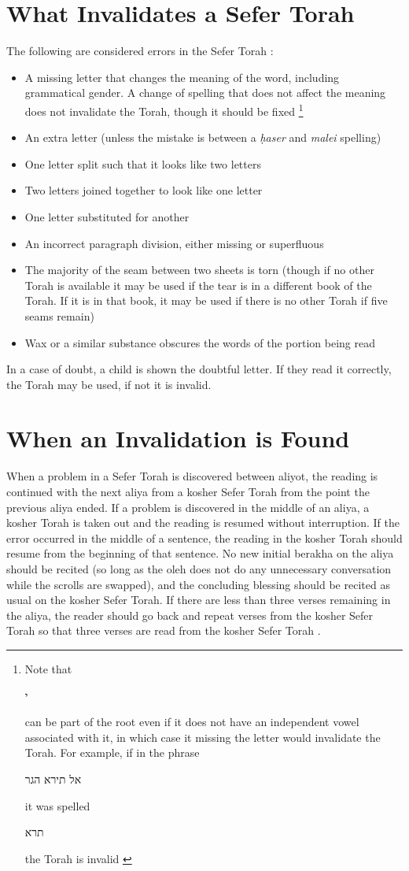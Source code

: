 \documentclass[11pt, openany]{article}
\newcommand{\hebword}[1]{‎\begin{hebrew}\beginR #1 \endR\end{hebrew}}
\newcommand{\heth}{\d{h}}
\begin{document}
		
\section*{What Invalidates a Sefer Torah}

The following are considered errors in the Sefer Torah \parencite*[24:1]{Kitzur}:
\begin{itemize}
	\item A missing letter that changes the meaning of the word, including grammatical gender. A change of spelling that does not affect the meaning does not invalidate the Torah, though it should be fixed \footnote{Note that\hebword{ י } can be part of the root even if it does not have an independent vowel associated with it, in which case it missing the letter would invalidate the Torah.  For example, if in the phrase \hebword{אל תירא הגר} it was spelled \hebword{תרא} the Torah is invalid \parencite*[24:1]{Kitzur}}
	\item An extra letter (unless the mistake is between a \textit{\heth aser} and \textit{malei} spelling)
	\item One letter split such that it looks like two letters
	\item Two letters joined together to look like one letter
	\item One letter substituted for another
	\item An incorrect paragraph division, either missing or superfluous
	\item The majority of the seam between two sheets is torn (though if no other Torah is available it may be used if the tear is in a different book of the Torah.  If it is in that book, it may be used if there is no other Torah if five seams remain)
	\item Wax or a similar substance obscures the words of the portion being read
\end{itemize}

In a case of doubt, a child is shown the doubtful letter.  If they read it correctly, the Torah may be used, if not it is invalid.

\section*{When an Invalidation is Found}

When a problem in a Sefer Torah is discovered between aliyot, the reading is continued with the next aliya from a kosher Sefer Torah from the point the previous aliya ended. If a problem is discovered in the middle of an aliya, a kosher Torah is taken out and the reading is resumed without interruption. If the error occurred in the middle of a sentence, the reading in the kosher Torah should resume from the beginning of that sentence.  No new initial berakha on the aliya should be recited (so long as the oleh does not do any unnecessary conversation while the scrolls are swapped), and the concluding blessing should be recited as usual on the kosher Sefer Torah. If there are less than three verses remaining in the aliya, the reader should go back and repeat verses from the kosher Sefer Torah so that three verses are read from the kosher Sefer Torah \parencite*[24:8]{Kitzur}.
\end{document}
